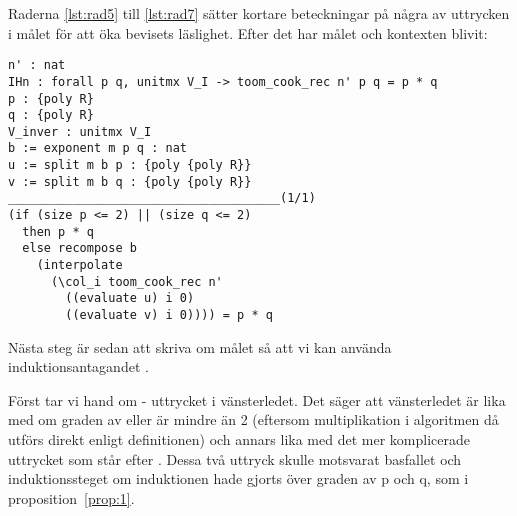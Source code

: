 Raderna \ref{lst:rad5} till \ref{lst:rad7} sätter kortare beteckningar på några
av uttrycken i målet för att öka bevisets läslighet. Efter det har målet och
kontexten blivit:
\begin{lstlisting}
n' : nat
IHn : forall p q, unitmx V_I -> toom_cook_rec n' p q = p * q
p : {poly R}
q : {poly R}
V_inver : unitmx V_I
b := exponent m p q : nat
u := split m b p : {poly {poly R}}
v := split m b q : {poly {poly R}}
______________________________________(1/1)
(if (size p <= 2) || (size q <= 2)
  then p * q
  else recompose b
    (interpolate
      (\col_i toom_cook_rec n'
        ((evaluate u) i 0)
        ((evaluate v) i 0)))) = p * q
\end{lstlisting}
Nästa steg är sedan att skriva om målet så att vi kan använda
induktionsantagandet .

Först tar vi hand om  - uttrycket i vänsterledet.
Det säger att vänsterledet är lika med  om graden
av  eller  är mindre än 2 (eftersom multiplikation i algoritmen
då utförs direkt enligt definitionen) och annars
lika med det mer komplicerade uttrycket som står efter . Dessa två
uttryck skulle motsvarat basfallet och induktionssteget om induktionen hade
gjorts över graden av p och q, som i proposition~\ref{prop:1}.

